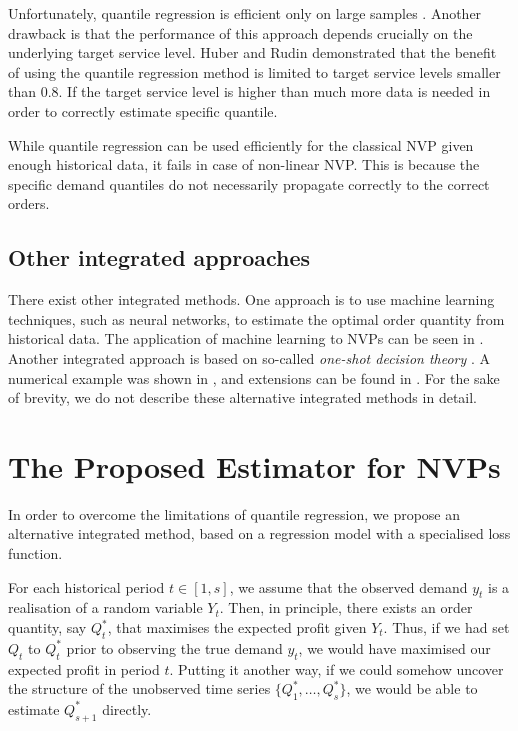 \documentclass{article}
\begin{document}
Unfortunately, quantile regression is efficient only on large samples \cite{Hu19,RV19}. Another drawback is that the performance of this approach depends crucially on the underlying target service level. Huber \cite{Hu19} and Rudin \cite{RV19} demonstrated that the benefit of using the quantile regression method is limited to target service levels smaller than 0.8. If the target service level is higher than much more data is needed in order to correctly estimate specific quantile.

While quantile regression can be used efficiently for the classical NVP given enough historical data, it fails in case of non-linear NVP. This is because the specific demand quantiles do not necessarily propagate correctly to the correct orders.

\subsection{Other integrated approaches} %

There exist other integrated methods. One approach is to use machine learning techniques, such as neural networks, to estimate the optimal order quantity from historical data. The application of machine learning to NVPs can be seen in \cite{CS19,OST20,RV19}. Another integrated approach is based on so-called \emph{one-shot decision theory} \cite{Guo11,GM14,Ma19}. A numerical example was shown in \cite{Guo11}, and extensions can be found in \cite{Ma19}. For the sake of brevity, we do not describe these alternative integrated methods in detail.

\section{The Proposed Estimator for NVPs} \label{se:new}

In order to overcome the limitations of quantile regression, we propose an alternative integrated method, based on a regression model with a specialised loss function.

For each historical period $t\in [1,s]$, we assume that the observed demand $y_t$ is a realisation of a random variable $Y_t$. Then, in principle, there exists an order quantity, say $Q_t^*$, that maximises the expected profit given $Y_t$. Thus, if we had set $Q_t$ to $Q_t^*$ prior to observing the true demand $y_t$, we would have maximised our expected profit in period $t$. Putting it another way, if we could somehow uncover the structure of the unobserved time series $\big\{ Q_1^*,\dots,Q_s^* \big\}$, we would be able to estimate $Q_{s+1}^*$ directly.
\end{document}
